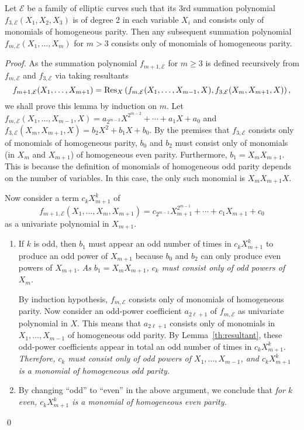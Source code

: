 %
\begin{lemma}
  \label{th:summation-polynomial}
  Let $\mathcal E$ be a family of elliptic curves such that its 3rd
  summation polynomial $f_{3,\mathcal E}(X_1,X_2,X_3)$ is of degree 2
  in each variable $X_i$ and consists only of monomials of homogeneous
  parity.
  Then any subsequent summation polynomial
  $f_{m,\mathcal E}(X_1,\ldots,X_m)$ for $m>3$ consists only of
  monomials of homogeneous parity.
\end{lemma}
% 
\begin{proof}
  As the summation polynomial $f_{m+1,\mathcal E}$ for
  $m\geq 3$ is defined recursively from $f_{m,\mathcal E}$ and
  $f_{3,\mathcal E}$ via taking resultants
  \[ f_{m+1,\mathcal E}(X_1,\dots,X_{m+1}) = \operatorname{Res}_X\left(f_{m,\mathcal
        E}(X_1,\dots,X_{m-1},X),f_{3,\mathcal
        E}(X_m,X_{m+1},X)\right), \]
  we shall prove this lemma by induction on $m$.
  Let
  $f_{m,\mathcal
    E}(X_1,\ldots,X_{m-1},X)=a_{2^{m-2}}X^{2^{m-2}}+\cdots+a_1X+a_0$
  and $f_{3,\mathcal E}(X_m,X_{m+1},X)=b_2X^2+b_1X+b_0$.
  By the premises that $f_{3,\mathcal E}$ consists only of monomials
  of homogeneous parity, $b_0$ and $b_2$ must consist only of
  monomials (in $X_m$ and $X_{m+1}$) of homogeneous even parity.
  Furthermore, $b_1=X_mX_{m+1}$.
  This is because the definition of monomials of homogeneous odd
  parity depends on the number of variables.
  In this case, the only such monomial is $X_mX_{m+1}X$.

  Now consider a term $c_kX_{m+1}^k$ of
  \[ f_{m+1,\mathcal
      E}(X_1,\ldots,X_m,X_{m+1})=c_{2^{m-1}}X_{m+1}^{2^{m-1}}+\cdots+c_1X_{m+1}+c_0 \]
  as a univariate polynomial in $X_{m+1}$.
  \begin{enumerate}
  \item If $k$ is odd, then $b_1$ must appear an odd number of times
    in $c_kX_{m+1}^k$ to produce an odd power of $X_{m+1}$ because
    $b_0$ and $b_2$ can only produce even powers of $X_{m+1}$.
    \emph{As $b_1=X_mX_{m+1}$, $c_k$ must consist only of odd powers
      of $X_m$.}

    By induction hypothesis, $f_{m,\mathcal E}$ consists only of
    monomials of homogeneous parity.
    Now consider an odd-power coefficient $a_{2\ell+1}$ of
    $f_{m,\mathcal E}$ as univariate polynomial in $X$.
    This means that $a_{2\ell+1}$ consists only of monomials in
    $X_1,\ldots,X_{m-1}$ of homogeneous odd parity.
    By Lemma~\ref{th:resultant}, these odd-power coefficients appear
    in total an odd number of times in $c_kX_{m+1}^k$.
    \emph{Therefore, $c_k$ must consist only of odd powers of
      $X_1,\ldots,X_{m-1}$, and $c_kX_{m+1}^k$ is a monomial of
      homogeneous odd parity.}
  \item By changing ``odd'' to ``even'' in the above argument, we
    conclude that \emph{for $k$ even, $c_kX_{m+1}^k$ is a monomial of
      homogeneous even parity.}
  \end{enumerate}
  \qed
\end{proof}

